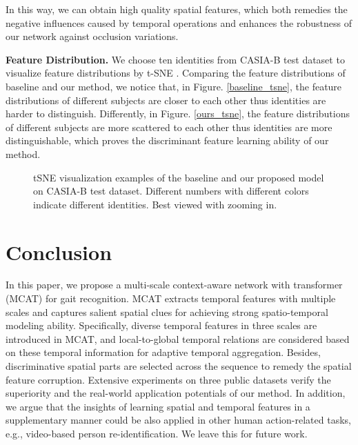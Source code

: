 \documentclass[journal]{IEEEtran}
\begin{document}
In this way, we can obtain high quality spatial features, which both remedies the negative influences caused by temporal operations and enhances the robustness of our network against occlusion variations.



\noindent \textbf{Feature Distribution.} We choose ten identities from CASIA-B test dataset to visualize feature distributions by t-SNE \cite{van2008visualizing}. Comparing the feature distributions of baseline and our method, we notice that, in Figure. \ref{baseline_tsne}, the feature distributions of different subjects are closer to each other thus identities are harder to distinguish. Differently, in Figure. \ref{ours_tsne}, the feature distributions of different subjects are more scattered to each other thus identities are more distinguishable, which proves the discriminant feature learning ability of our method.

\begin{figure}[ht]
\centering
{}\centering
\caption{tSNE visualization examples of the baseline and our proposed model on CASIA-B test dataset. Different numbers with different colors indicate different identities. Best viewed with zooming in.}
\end{figure}

\section{Conclusion}
\label{conclusion}
In this paper, we propose a multi-scale context-aware network with transformer (MCAT) for gait recognition. 
MCAT extracts temporal features with multiple scales and captures salient spatial clues for achieving strong spatio-temporal modeling ability. Specifically, diverse temporal features in three scales are introduced in MCAT, and local-to-global temporal relations are considered based on these temporal information for adaptive temporal aggregation. Besides, discriminative spatial parts are selected across the sequence to remedy the spatial feature corruption. Extensive experiments on three public datasets verify the superiority and the real-world application potentials of our method. In addition, we argue that the insights of learning spatial and temporal features in a supplementary manner could be also applied in other human action-related tasks, e.g., video-based person re-identification. We leave this for future work.  
\end{document}
